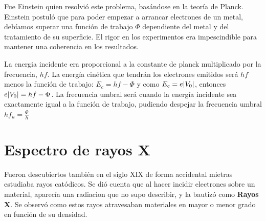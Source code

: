 \documentclass{report}
\begin{document}

    \vspace{0.4cm} \noindent Fue Einstein quien resolvió este problema, basándose en la teoría de Planck. Einstein postuló que para poder empezar a arrancar
    electrones de un metal, debíamos superar una función de trabajo $\Phi$ dependiente del metal y del tratamiento de su superficie.
    El rigor en los experimentos era impescindible para mantener una coherencia en los resultados.

    \vspace{0.4cm} \noindent La energia incidente era proporcional a la constante de planck multiplicado por la frecuencia, $h f$. La energía cinética que 
    tendrán los electrones emitidos será $h f$ menos la función de trabajo: $E_c=hf-\Phi$ y como $E_c=e\lvert V_0\rvert$, entonces 
    $e\lvert V_0\rvert=hf-\Phi$. La frecuencia umbral será cuando la energía incidente sea exactamente igual a la función de trabajo,
    pudiendo despejar la frecuencia umbral $h f_u=\frac{\Phi}{h}$

  \section{Espectro de rayos X}
    \noindent Fueron descubiertos también en el siglo XIX de forma accidental mietras estudiaba rayos catódicos. Se dió cuenta que al hacer 
    incidir electrones sobre un material, aparecía una radiacion que no supo describir, y la bautizó como \textbf{Rayos X}. Se observó
    como estos rayos atravesaban materiales en mayor o menor grado en función de su densidad.
\end{document}

